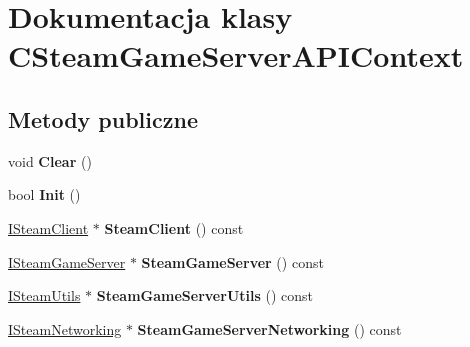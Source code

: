 \hypertarget{class_c_steam_game_server_a_p_i_context}{}\section{Dokumentacja klasy C\+Steam\+Game\+Server\+A\+P\+I\+Context}
\label{class_c_steam_game_server_a_p_i_context}
\subsection*{Metody publiczne}
\begin{DoxyCompactItemize}
\item 
\mbox{\label{class_c_steam_game_server_a_p_i_context_a4c8f938b008d5fc327445fa716d4cbc5}} 
void {\bfseries Clear} ()
\item 
\mbox{\label{class_c_steam_game_server_a_p_i_context_acb22f8cee0702f505436361dc32e817e}} 
bool {\bfseries Init} ()
\item 
\mbox{\label{class_c_steam_game_server_a_p_i_context_aa9b0faf1b69c590def33bb94d7ef01fc}} 
\hyperlink{class_i_steam_client}{I\+Steam\+Client} $\ast$ {\bfseries Steam\+Client} () const
\item 
\mbox{\label{class_c_steam_game_server_a_p_i_context_a40fecf64b9ac3e2283a5dd13615c1723}} 
\hyperlink{class_i_steam_game_server}{I\+Steam\+Game\+Server} $\ast$ {\bfseries Steam\+Game\+Server} () const
\item 
\mbox{\label{class_c_steam_game_server_a_p_i_context_a42dcf287fb9e4acb73f3fdece8f73698}} 
\hyperlink{class_i_steam_utils}{I\+Steam\+Utils} $\ast$ {\bfseries Steam\+Game\+Server\+Utils} () const
\item 
\mbox{\label{class_c_steam_game_server_a_p_i_context_a36e2c3313c2202c0d43d30f916a56076}} 
\hyperlink{class_i_steam_networking}{I\+Steam\+Networking} $\ast$ {\bfseries Steam\+Game\+Server\+Networking} () const
\item 
\mbox{\label{class_c_steam_game_server_a_p_i_context_af5f13230cd57a1ff4b3a1d35d905e6b2}} 

\end{DoxyCompactItemize}
